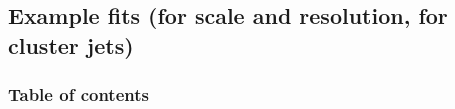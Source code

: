 \documentclass[8pt]{beamer}
\begin{document}
%      
%     
%      
%      
%     
%      
 
 
 
 
  \subsection{Example fits (for scale and resolution, for cluster jets)}

\begin{frame}
 \frametitle{Table of contents}
 
\end{frame}
\end{document}
